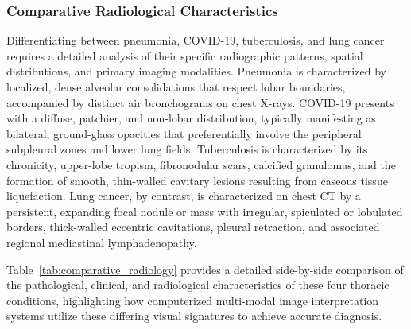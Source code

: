 \subsubsection{Comparative Radiological Characteristics}

Differentiating between pneumonia, COVID-19, tuberculosis, and lung cancer requires a detailed analysis of their specific radiographic patterns, spatial distributions, and primary imaging modalities. Pneumonia is characterized by localized, dense alveolar consolidations that respect lobar boundaries, accompanied by distinct air bronchograms on chest X-rays. COVID-19 presents with a diffuse, patchier, and non-lobar distribution, typically manifesting as bilateral, ground-glass opacities that preferentially involve the peripheral subpleural zones and lower lung fields. Tuberculosis is characterized by its chronicity, upper-lobe tropism, fibronodular scars, calcified granulomas, and the formation of smooth, thin-walled cavitary lesions resulting from caseous tissue liquefaction. Lung cancer, by contrast, is characterized on chest CT by a persistent, expanding focal nodule or mass with irregular, spiculated or lobulated borders, thick-walled eccentric cavitations, pleural retraction, and associated regional mediastinal lymphadenopathy. 

Table~\ref{tab:comparative_radiology} provides a detailed side-by-side comparison of the pathological, clinical, and radiological characteristics of these four thoracic conditions, highlighting how computerized multi-modal image interpretation systems utilize these differing visual signatures to achieve accurate diagnosis.

